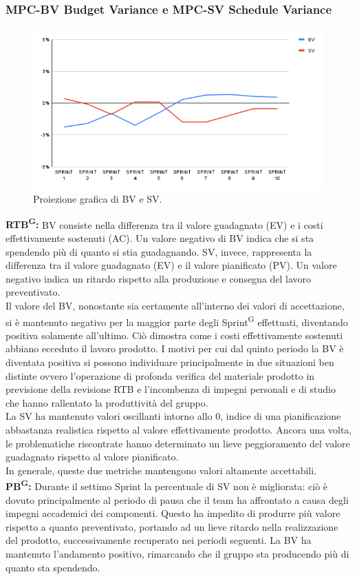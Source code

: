 \documentclass[8pt]{article}
\newcommand{\glossterm}[1]{#1\textsuperscript{G}} %
\begin{document}
\subsubsection{MPC-BV Budget Variance e MPC-SV Schedule Variance}
\begin{figure}[h!]
    \centering
    \includegraphics[width=1\textwidth]{images_pdq/BV_SV.png}
    \caption{Proiezione grafica di BV e SV.}
    \label{fig:Proiezione grafica di BV e SV}
\end{figure}
\textbf{\glossterm{RTB}:} BV consiste nella differenza tra il valore guadagnato (EV) e i costi effettivamente sostenuti (AC). Un valore negativo di BV indica che si sta spendendo più di quanto si stia guadagnando. SV, invece, rappresenta la differenza tra il valore guadagnato (EV) e il valore pianificato (PV). Un valore negativo indica un ritardo rispetto alla produzione e consegna del lavoro preventivato.\\
Il valore del BV, nonostante sia certamente all'interno dei valori di accettazione, si è mantenuto negativo per la maggior parte degli \glossterm{Sprint} effettuati, diventando positiva solamente all'ultimo. Ciò dimostra come i costi effettivamente sostenuti abbiano ecceduto il lavoro prodotto. I motivi per cui dal quinto periodo la BV è diventata positiva si possono individuare principalmente in due situazioni ben distinte ovvero l'operazione di profonda verifica del materiale prodotto in previsione della revisione RTB e l'incombenza di impegni personali e di studio che hanno rallentato la produttività del gruppo.\\
La SV ha mantenuto valori oscillanti intorno allo 0, indice di una pianificazione abbastanza realistica rispetto al valore effettivamente prodotto. Ancora una volta, le problematiche riscontrate hanno determinato un lieve peggioramento del valore guadagnato rispetto al valore pianificato.\\
In generale, queste due metriche mantengono valori altamente accettabili.\\
\textbf{\glossterm{PB}:} Durante il settimo Sprint la percentuale di SV non è migliorata: ciò è dovuto principalmente al periodo di pausa che il team ha affrontato a causa degli impegni accademici dei componenti. Questo ha impedito di produrre più valore rispetto a quanto preventivato, portando ad un lieve ritardo nella realizzazione del prodotto, successivamente recuperato nei periodi seguenti. La BV ha mantenuto l'andamento positivo, rimarcando che il gruppo sta producendo più di quanto sta spendendo.
\clearpage
\end{document}
